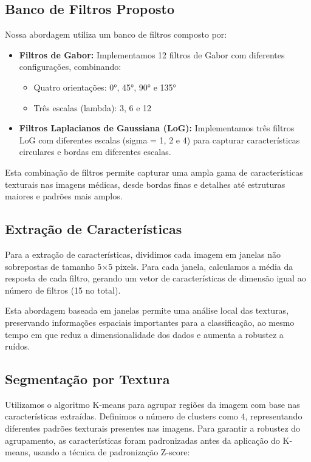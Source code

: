 \documentclass[sigconf,nonacm]{acmart}
\begin{document}
\subsection{Banco de Filtros Proposto}

Nossa abordagem utiliza um banco de filtros composto por:

\begin{itemize}
  \item \textbf{Filtros de Gabor:} Implementamos 12 filtros de Gabor com diferentes configurações, combinando:
  \begin{itemize}
    \item Quatro orientações: 0°, 45°, 90° e 135°
    \item Três escalas (lambda): 3, 6 e 12
  \end{itemize}
  \item \textbf{Filtros Laplacianos de Gaussiana (LoG):} Implementamos três filtros LoG com diferentes escalas (sigma = 1, 2 e 4) para capturar características circulares e bordas em diferentes escalas.
\end{itemize}

Esta combinação de filtros permite capturar uma ampla gama de características texturais nas imagens médicas, desde bordas finas e detalhes até estruturas maiores e padrões mais amplos.

\subsection{Extração de Características}

Para a extração de características, dividimos cada imagem em janelas não sobrepostas de tamanho 5×5 pixels. Para cada janela, calculamos a média da resposta de cada filtro, gerando um vetor de características de dimensão igual ao número de filtros (15 no total).

Esta abordagem baseada em janelas permite uma análise local das texturas, preservando informações espaciais importantes para a classificação, ao mesmo tempo em que reduz a dimensionalidade dos dados e aumenta a robustez a ruídos.

\subsection{Segmentação por Textura}

Utilizamos o algoritmo K-means para agrupar regiões da imagem com base nas características extraídas. Definimos o número de clusters como 4, representando diferentes padrões texturais presentes nas imagens. Para garantir a robustez do agrupamento, as características foram padronizadas antes da aplicação do K-means, usando a técnica de padronização Z-score:
\end{document}
